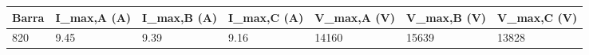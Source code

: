 \begin{tabular}{lllllll}
\toprule
Barra & I_{max,A} (A) & I_{max,B} (A) & I_{max,C} (A) & V_{max,A} (V) & V_{max,B} (V) & V_{max,C} (V) \\
\midrule
820 & 9.45 & 9.39 & 9.16 & 14160 & 15639 & 13828 \\
\bottomrule
\end{tabular}

